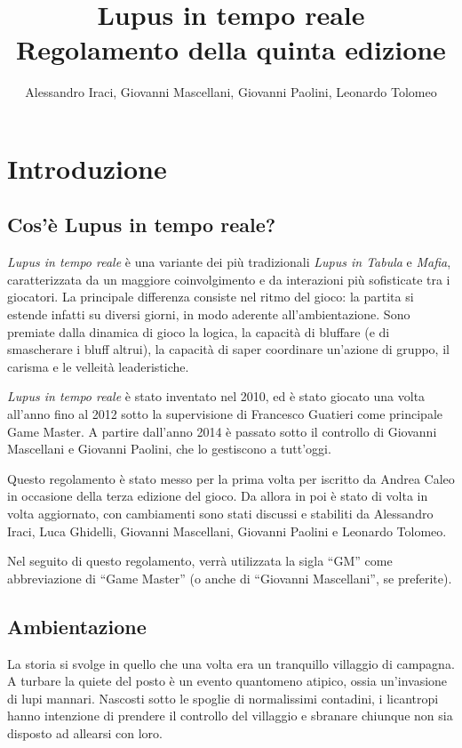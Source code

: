 \documentclass[a4paper,10pt]{article}
\title{Lupus in tempo reale\\ Regolamento della quinta edizione}
\author{Alessandro Iraci, Giovanni Mascellani, Giovanni Paolini, Leonardo Tolomeo}
\begin{document}
\maketitle


\section{Introduzione}

\subsection{Cos'è Lupus in tempo reale?}

\emph{Lupus in tempo reale} è una variante dei più tradizionali \emph{Lupus in
Tabula} e \emph{Mafia}, caratterizzata da un maggiore coinvolgimento e da
interazioni più sofisticate tra i giocatori.
La principale differenza consiste nel ritmo del gioco: la partita si estende
infatti su diversi giorni, in modo aderente all'ambientazione.
Sono premiate dalla dinamica di gioco la logica, la capacità di bluffare (e di
smascherare i bluff altrui), la capacità di saper coordinare un’azione di
gruppo, il carisma e le velleità leaderistiche.

\emph{Lupus in tempo reale} è stato inventato nel 2010, ed è stato
giocato una volta all'anno fino al 2012 sotto la supervisione di
Francesco Guatieri come principale Game Master.  A partire dall'anno
2014 è passato sotto il controllo di Giovanni Mascellani e Giovanni
Paolini, che lo gestiscono a tutt'oggi.

Questo regolamento è stato messo per la prima volta per iscritto da
Andrea Caleo in occasione della terza edizione del gioco. Da allora in
poi è stato di volta in volta aggiornato, con cambiamenti sono stati
discussi e stabiliti da Alessandro Iraci, Luca Ghidelli, Giovanni
Mascellani, Giovanni Paolini e Leonardo Tolomeo.

Nel seguito di questo regolamento, verrà utilizzata la sigla ``GM''
come abbreviazione di ``Game Master'' (o anche di ``Giovanni
Mascellani'', se preferite).

\subsection{Ambientazione}

La storia si svolge in quello che una volta era un tranquillo villaggio di
campagna. A turbare la quiete del posto è un evento quantomeno atipico, ossia
un'invasione di lupi mannari. Nascosti sotto le spoglie di normalissimi
contadini, i licantropi hanno intenzione di prendere il controllo del villaggio
e sbranare chiunque non sia disposto ad allearsi con loro.
\end{document}
